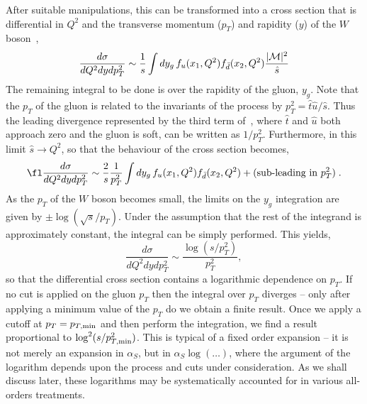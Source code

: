 \documentclass[12pt]{iopart}
\def\as{\alpha_S}
\begin{document}
After suitable manipulations, this can be transformed into
a cross section that is differential in $Q^2$ and the transverse momentum ($p_T$)
and rapidity ($y$) of the $W$ boson~\cite{Kajantie:1978qv},
\begin{equation}
\frac{d\sigma}{dQ^2 dy dp_T^2} \sim \frac{1}{s} \int dy_g  \,
 f_u(x_1,Q^2) f_{\bar d}(x_2,Q^2) \frac{|{\cal M}|^2}{{\hat s}}
\end{equation} 
The remaining integral to be done is over the rapidity of the gluon, $y_g$. Note that
the $p_T$ of the gluon is related to the invariants of the process by
$p_T^2={\hat t}{\hat u}/{\hat s}$. Thus the leading divergence represented by the third
term of~, where ${\hat t}$ and ${\hat u}$ both approach zero and the gluon
is soft, can be written as $1/p_T^2$. Furthermore, in this limit ${\hat s} \to Q^2$, so that 
the behaviour of the cross section becomes,
\begin{equation}
\fl
\frac{d\sigma}{dQ^2 dy dp_T^2} \sim \frac{2}{s} \frac{1}{p_T^2} \int dy_g \,
 f_u(x_1,Q^2) f_{\bar d}(x_2,Q^2) + (\mbox{sub-leading in }p_T^2) \; .
\end{equation} 
As the $p_T$ of the $W$ boson becomes small, the limits on the $y_g$ integration are given
by $\pm \log(\sqrt{s}/p_T)$. Under
the assumption that the rest of the integrand is approximately constant, the integral
can be simply performed. This yields,
\begin{equation}
\frac{d\sigma}{dQ^2 dy dp_T^2} \sim \frac{\log(s/p_T^2)}{p_T^2},
\label{eq:dylog}
\end{equation}
so that the differential cross section contains a logarithmic dependence on $p_T$. If no cut
is applied on the gluon $p_T$ then the integral over $p_T$ diverges -- only after applying a
minimum value of the $p_T$ do we obtain a finite result. Once we apply a cutoff at
$p_T=p_{T,{\rm min}}$ and then perform the integration, we find a result proportional to
$\log^2(s/p_{T,{\rm min}}^2)$. This is typical of a fixed order expansion -- it is not merely an
expansion in $\as$, but in $\as \log(\ldots)$, where the argument of the logarithm
depends upon the process and cuts under consideration. As we shall discuss later, these
logarithms may be systematically accounted for in various all-orders treatments.
\end{document}
